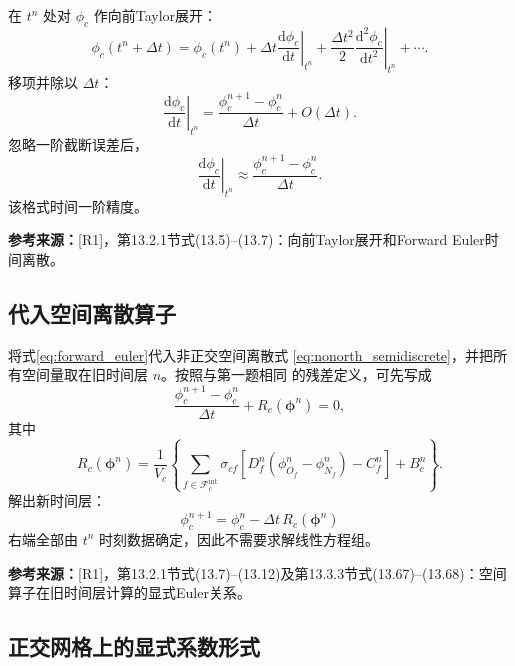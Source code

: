 \documentclass[UTF8,12pt,a4paper]{ctexart}
\numberwithin{equation}{section}
\newcommand{\Rone}{\textnormal{[R1]}}
\newcommand{\source}[1]{%
  \par\smallskip
  \noindent\colorbox{sourcebg}{%
    \parbox{0.955\linewidth}{\raggedright\footnotesize\color{sourcegray}\textbf{参考来源：}#1}%
  }
  \par\smallskip
}
\begin{document}
在 $t^n$ 处对 $\phi_c$ 作向前Taylor展开：
\begin{equation}
  \phi_c(t^n+\Delta t)
  =\phi_c(t^n)
  +\Delta t\left.\frac{\mathrm d\phi_c}{\mathrm dt}\right|_{t^n}
  +\frac{\Delta t^2}{2}
   \left.\frac{\mathrm d^2\phi_c}{\mathrm dt^2}\right|_{t^n}
  +\cdots.
  \label{eq:taylor_time}
\end{equation}
移项并除以 $\Delta t$：
\begin{equation}
  \left.\frac{\mathrm d\phi_c}{\mathrm dt}\right|_{t^n}
  =\frac{\phi_c^{n+1}-\phi_c^n}{\Delta t}
  +O(\Delta t).
  \label{eq:forward_difference}
\end{equation}
忽略一阶截断误差后，
\begin{equation}
  \boxed{
  \left.\frac{\mathrm d\phi_c}{\mathrm dt}\right|_{t^n}
  \approx\frac{\phi_c^{n+1}-\phi_c^n}{\Delta t}}.
  \label{eq:forward_euler}
\end{equation}
该格式时间一阶精度。

\source{\Rone，第13.2.1节式(13.5)--(13.7)：向前Taylor展开和Forward Euler时间离散。}

\subsection{代入空间离散算子}

将式\eqref{eq:forward_euler}代入非正交空间离散式
\eqref{eq:nonorth_semidiscrete}，并把所有空间量取在旧时间层 $n$。按照与第一题相同
的残差定义，可先写成
\begin{equation}
  \frac{\phi_c^{n+1}-\phi_c^n}{\Delta t}
  +R_c(\bm\phi^n)=0,
  \label{eq:fully_discrete_before_solve}
\end{equation}
其中
\begin{equation}
  R_c(\bm\phi^n)
  =\frac{1}{V_c}\left\{
  \sum_{f\in\mathcal F_c^{\mathrm{int}}}
  \sigma_{cf}\left[
  D_f^n(\phi_{O_f}^n-\phi_{N_f}^n)-C_f^n\right]+B_c^n
  \right\}.
  \label{eq:explicit_diffusive_residual}
\end{equation}
解出新时间层：
\begin{equation}
  \boxed{
  \phi_c^{n+1}
  =\phi_c^n
  -\Delta t\,R_c(\bm\phi^n)}
  \label{eq:fully_explicit_general}
\end{equation}
右端全部由 $t^n$ 时刻数据确定，因此不需要求解线性方程组。

\source{\Rone，第13.2.1节式(13.7)--(13.12)及第13.3.3节式(13.67)--(13.68)：空间算子在旧时间层计算的显式Euler关系。}

\subsection{正交网格上的显式系数形式}
\end{document}
